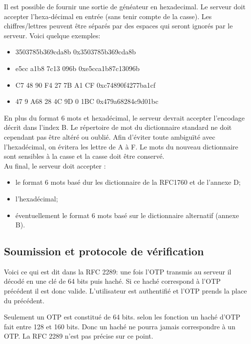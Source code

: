 \documentclass{../res/univ-projet}
\begin{document}
        Il est possible de fournir une sortie de généateur en hexadecimal. Le 
serveur doit accepter l'hexa-décimal en entrée (sans tenir compte de la casse). 
Les chiffres/lettres peuvent être séparés par des espaces qui seront ignorés 
par 
le serveur. Voici quelque exemples:
        \begin{itemize}
            \item 3503785b369cda8b              0x3503785b369cda8b
            \item e5cc a1b8 7c13 096b           0xe5cca1b87c13096b
            \item C7 48 90 F4 27 7B A1 CF       0xc74890f4277ba1cf
            \item 47 9 A68 28 4C 9D 0 1BC       0x479a68284c9d01bc
        \end{itemize}

        En plus du format 6 mots et hexadécimal, le serveur devrait accepter 
l'encodage décrit dans l'index B. Le répertoire de mot du dictionnaire standard ne doit 
cependant pas \^etre altéré ou oubli\'e. Afin d'\'eviter toute ambiguïté avec 
l'hexadécimal, on \'evitera les lettre de A à F. Le mots du nouveau dictionnaire sont 
sensibles à la casse et la casse doit être conservé.\\

        Au final, le serveur doit accepter :
        \begin{itemize}
            \item le format 6 mots basé dur les dictionnaire de la RFC1760 et de 
            l'annexe D;
            \item l'hexadécimal;
            \item éventuellement le format 6 mots basé sur le dictionnaire alternatif 
            (annexe B).
        \end{itemize}
  
  \subsection{Soumission et protocole de vérification}
        Voici ce qui est dit dans la RFC 2289:
    une fois l'OTP transmis au serveur il décodé en une clé de 64 bits puis haché.
    Si ce haché correspond à l'OTP précédent il est donc valide.
    L'utilisateur est authentifié et l'OTP prends la place du précédent.
    
        Seulement un OTP est constitué de 64 bits. selon les fonction un haché
    d'OTP fait entre 128 et 160 bits. Donc un haché ne pourra jamais correspondre
    à un OTP. La RFC 2289 n'est pas précise sur ce point.
  
\end{document}
